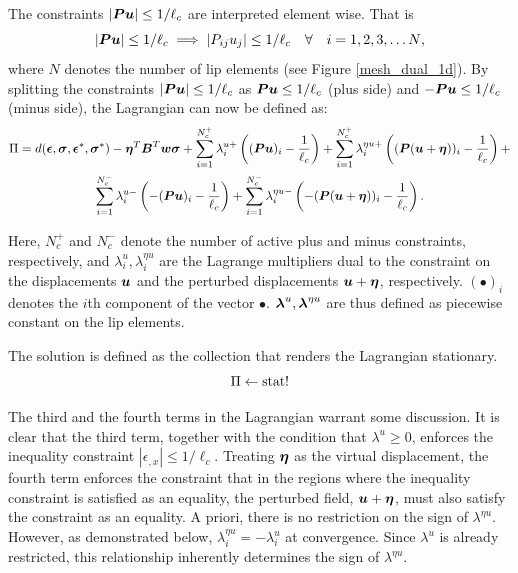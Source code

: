 \documentclass[10pt]{cas-sc}
\newcommand{\added}[1]{#1}
\begin{document}
The constraints $|\mbox{\boldmath $P$} \mbox{\boldmath $u$}|  \leq 1/{\ell_c}$ are interpreted element wise. That is
\begin{equation}
	|\mbox{\boldmath $P$} \mbox{\boldmath $u$}|  \leq 1/{\ell_c} \implies |P_{ij}u_j|  \leq 1/{\ell_c} \quad \forall \quad i={1,2,3,\dots N},
\end{equation}
where  $N$ denotes the number of \added{lip} elements (see Figure \ref{mesh_dual_1d}).  By splitting the constraints $|\mbox{\boldmath $P$} \mbox{\boldmath $u$}|  \leq 1/{\ell_c}$ as $\mbox{\boldmath $P$} \mbox{\boldmath $u$}  \leq 1/{\ell_c}$ (plus side) and $-\mbox{\boldmath $P$} \mbox{\boldmath $u$}  \leq 1/{\ell_c}$ (minus side), the Lagrangian can now be defined as:
\begin{multline}
	\Pi = d(\mbox{\boldmath $\epsilon$},\mbox{\boldmath $\sigma$},\mbox{\boldmath $\epsilon$}^*,\mbox{\boldmath $\sigma$}^*) - \mbox{\boldmath $\eta$}^T \mbox{\boldmath $B$} ^T \mbox{\boldmath $w$}\mbox{\boldmath $\sigma$} + \sum_{i=1}^{N_c^+} \lambda^{u+}_i \left( (\mbox{\boldmath $P$} \mbox{\boldmath $u$})_i - \frac{1}{\ell_c}   \right) + \sum_{i=1}^{N_c^+} \lambda^{\eta u +}_i \left( (\mbox{\boldmath $P$} (\mbox{\boldmath $u$} + \mbox{\boldmath $\eta$}))_i - \frac{1}{\ell_c}   \right) + \\
	\sum_{i=1}^{N_c^-} \lambda^{u-}_i \left( -(\mbox{\boldmath $P$} \mbox{\boldmath $u$})_i - \frac{1}{\ell_c}   \right) + \sum_{i=1}^{N_c^-} \lambda^{\eta u-}_i \left( -(\mbox{\boldmath $P$} (\mbox{\boldmath $u$} + \mbox{\boldmath $\eta$}))_i - \frac{1}{\ell_c}   \right) \label{big_1D_lagrangian}.
\end{multline}

Here, $N_c^+$ and $N_c^-$ denote the number of active plus and minus constraints, respectively, and $\lambda^u_i, \lambda^{\eta u}_i$ are the Lagrange multipliers dual to the constraint on the displacements $\mbox{\boldmath $u$}$ and the perturbed displacements $\mbox{\boldmath $u$} + \mbox{\boldmath $\eta$}$, respectively. $(\bullet)_i$ denotes the $i$th component of the vector $\bullet$. $\mbox{\boldmath $\lambda$}^u, \mbox{\boldmath $\lambda$}^{\eta u}$ are thus defined as piecewise constant on the \added{lip} elements.

The solution is defined as the collection that renders the Lagrangian stationary.
\begin{equation}
	\Pi  \leftarrow \operatorname{stat}!
\end{equation}

The third and the fourth terms in the Lagrangian warrant some discussion. It is clear that the third term, together with the condition that $\lambda^u \geq 0$, enforces the inequality constraint $|\epsilon_{,x}| \leq 1/\ell_c$. Treating $\mbox{\boldmath $\eta$}$ as the virtual displacement, the fourth term enforces the constraint that in the regions where the inequality constraint is satisfied as an equality, the perturbed field, $\mbox{\boldmath $u$}+\mbox{\boldmath $\eta$}$, must also satisfy the constraint as an equality. A priori, there is no restriction on the sign of $\lambda^{\eta u}$. However, as demonstrated below, $\lambda^{\eta u}_i = -\lambda^{ u}_i$ at convergence. Since $\lambda^u$ is already restricted, this relationship inherently determines the sign of $\lambda^{\eta u}$. 
\end{document}

